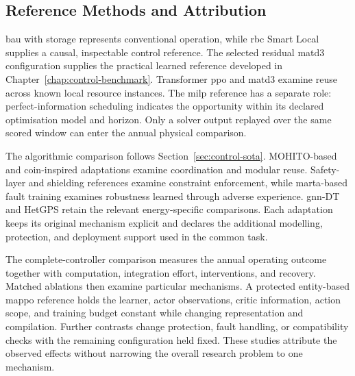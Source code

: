 \subsection{Reference Methods and Attribution}
\label{sec:timarl-comparison-design}

\gls{bau} with storage represents conventional operation, while \gls{rbc} Smart Local supplies a causal, inspectable control reference. The selected residual \gls{matd3} configuration supplies the practical learned reference developed in Chapter~\ref{chap:control-benchmark}. Transformer \gls{ppo} and \gls{matd3} examine reuse across known local resource instances. The \gls{milp} reference has a separate role: perfect-information scheduling indicates the opportunity within its declared optimisation model and horizon. Only a solver output replayed over the same scored window can enter the annual physical comparison.

The algorithmic comparison follows Section~\ref{sec:control-sota}. MOHITO-based and \gls{coin}-inspired adaptations examine coordination and modular reuse. Safety-layer and shielding references examine constraint enforcement, while \gls{marta}-based fault training examines robustness learned through adverse experience. \gls{gnn}-DT and HetGPS retain the relevant energy-specific comparisons. Each adaptation keeps its original mechanism explicit and declares the additional modelling, protection, and deployment support used in the common task.

The complete-controller comparison measures the annual operating outcome together with computation, integration effort, interventions, and recovery. Matched ablations then examine particular mechanisms. A protected entity-based \gls{mappo} reference holds the learner, actor observations, critic information, action scope, and training budget constant while changing representation and compilation. Further contrasts change protection, fault handling, or compatibility checks with the remaining configuration held fixed. These studies attribute the observed effects without narrowing the overall research problem to one mechanism.

